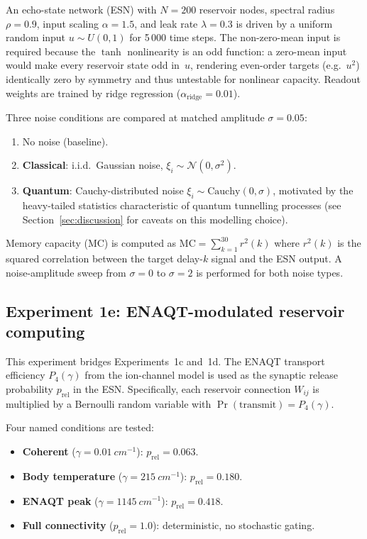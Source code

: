 \documentclass[twocolumn,11pt]{article}
\newcommand{\MC}{\mathrm{MC}}
\newcommand{\Pfour}{P_{4}}
\begin{document}
An echo-state network (ESN) with $N = 200$ reservoir nodes,
spectral radius $\rho = 0.9$, input scaling $\alpha = 1.5$,
and leak rate $\lambda = 0.3$ is driven by a uniform random
input $u \sim U(0, 1)$ for 5\,000 time steps.
The non-zero-mean input is required because the $\tanh$
nonlinearity is an odd function: a zero-mean input would make
every reservoir state odd in~$u$, rendering even-order targets
(e.g.\ $u^2$) identically zero by symmetry and thus
untestable for nonlinear capacity.
Readout weights are trained by ridge regression
($\alpha_{\mathrm{ridge}} = 0.01$).

Three noise conditions are compared at matched amplitude
$\sigma = 0.05$:
\begin{enumerate}
  \item No noise (baseline).
  \item \textbf{Classical}: i.i.d.\ Gaussian noise,
    $\xi_i \sim \mathcal{N}(0, \sigma^2)$.
  \item \textbf{Quantum}: Cauchy-distributed noise
    $\xi_i \sim \mathrm{Cauchy}(0, \sigma)$, motivated by
    the heavy-tailed statistics characteristic of quantum
    tunnelling processes (see Section~\ref{sec:discussion}
    for caveats on this modelling choice).
\end{enumerate}

Memory capacity (MC) is computed as
$\MC = \sum_{k=1}^{30} r^2(k)$ where $r^2(k)$ is the
squared correlation between the target delay-$k$ signal and
the ESN output.
A noise-amplitude sweep from $\sigma = 0$ to $\sigma = 2$ is
performed for both noise types.

\subsection{Experiment 1e: ENAQT-modulated reservoir computing}
\label{sec:meth-1e}

This experiment bridges Experiments~1c and~1d.
The ENAQT transport efficiency $\Pfour(\gamma)$ from the
ion-channel model is used as the synaptic release probability
$p_{\mathrm{rel}}$ in the ESN.  Specifically, each reservoir
connection $W_{ij}$ is multiplied by a Bernoulli random variable
with $\Pr(\text{transmit}) = \Pfour(\gamma)$.

Four named conditions are tested:
\begin{itemize}
  \item \textbf{Coherent} ($\gamma = \SI{0.01}{cm^{-1}}$):
    $p_{\mathrm{rel}} = 0.063$.
  \item \textbf{Body temperature}
    ($\gamma = \SI{215}{cm^{-1}}$):
    $p_{\mathrm{rel}} = 0.180$.
  \item \textbf{ENAQT peak}
    ($\gamma = \SI{1145}{cm^{-1}}$):
    $p_{\mathrm{rel}} = 0.418$.
  \item \textbf{Full connectivity} ($p_{\mathrm{rel}} = 1.0$):
    deterministic, no stochastic gating.
\end{itemize}
\end{document}
